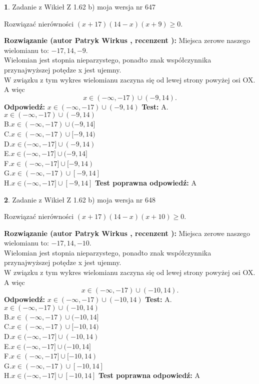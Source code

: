 \documentclass[12pt, a4paper]{article}
\theoremstyle{definition} %
\newtheorem{zad}{}
\newcommand{\zadStart}[1]{\begin{zad}#1\newline}
\newcommand{\zadStop}{\end{zad}}
\newcommand{\rozwStart}[2]{\noindent \textbf{Rozwiązanie (autor #1 , recenzent #2): }\newline}
\newcommand{\rozwStop}{\newline}
\newcommand{\odpStart}{\noindent \textbf{Odpowiedź:}\newline}
\newcommand{\odpStop}{\newline}
\newcommand{\testStart}{\noindent \textbf{Test:}\newline}
\newcommand{\testStop}{\newline}
\newcommand{\kluczStart}{\noindent \textbf{Test poprawna odpowiedź:}\newline}
\newcommand{\kluczStop}{\newline}
\begin{document}
\zadStart{Zadanie z Wikieł Z 1.62 b) moja wersja nr 647}

Rozwiązać nierówności $(x+17)(14-x)(x+9)\ge0$.
\zadStop
\rozwStart{Patryk Wirkus}{}
Miejsca zerowe naszego wielomianu to: $-17, 14, -9$.\\
Wielomian jest stopnia nieparzystego, ponadto znak współczynnika przy\linebreak najwyższej potędze x jest ujemny.\\ W związku z tym wykres wielomianu zaczyna się od lewej strony powyżej osi OX. A więc $$x \in (-\infty,-17) \cup (-9,14).$$
\rozwStop
\odpStart
$x \in (-\infty,-17) \cup (-9,14)$
\odpStop
\testStart
A.$x \in (-\infty,-17) \cup (-9,14)$\\
B.$x \in (-\infty,-17) \cup (-9,14]$\\
C.$x \in (-\infty,-17) \cup [-9,14)$\\
D.$x \in (-\infty,-17] \cup (-9,14)$\\
E.$x \in (-\infty,-17] \cup (-9,14]$\\
F.$x \in (-\infty,-17] \cup [-9,14)$\\
G.$x \in (-\infty,-17) \cup [-9,14]$\\
H.$x \in (-\infty,-17] \cup [-9,14]$
\testStop
\kluczStart
A
\kluczStop



\zadStart{Zadanie z Wikieł Z 1.62 b) moja wersja nr 648}

Rozwiązać nierówności $(x+17)(14-x)(x+10)\ge0$.
\zadStop
\rozwStart{Patryk Wirkus}{}
Miejsca zerowe naszego wielomianu to: $-17, 14, -10$.\\
Wielomian jest stopnia nieparzystego, ponadto znak współczynnika przy\linebreak najwyższej potędze x jest ujemny.\\ W związku z tym wykres wielomianu zaczyna się od lewej strony powyżej osi OX. A więc $$x \in (-\infty,-17) \cup (-10,14).$$
\rozwStop
\odpStart
$x \in (-\infty,-17) \cup (-10,14)$
\odpStop
\testStart
A.$x \in (-\infty,-17) \cup (-10,14)$\\
B.$x \in (-\infty,-17) \cup (-10,14]$\\
C.$x \in (-\infty,-17) \cup [-10,14)$\\
D.$x \in (-\infty,-17] \cup (-10,14)$\\
E.$x \in (-\infty,-17] \cup (-10,14]$\\
F.$x \in (-\infty,-17] \cup [-10,14)$\\
G.$x \in (-\infty,-17) \cup [-10,14]$\\
H.$x \in (-\infty,-17] \cup [-10,14]$
\testStop
\kluczStart
A
\kluczStop
\end{document}
